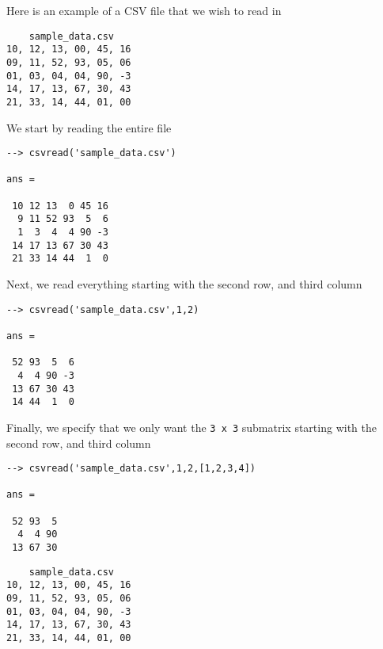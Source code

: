 Here is an example of a CSV file that we wish to read in
\begin{verbatim}
    sample_data.csv
10, 12, 13, 00, 45, 16
09, 11, 52, 93, 05, 06
01, 03, 04, 04, 90, -3
14, 17, 13, 67, 30, 43
21, 33, 14, 44, 01, 00
\end{verbatim}
We start by reading the entire file
\begin{verbatim}
--> csvread('sample_data.csv')

ans = 

 10 12 13  0 45 16 
  9 11 52 93  5  6 
  1  3  4  4 90 -3 
 14 17 13 67 30 43 
 21 33 14 44  1  0 
\end{verbatim}
Next, we read everything starting with the second row, and third column
\begin{verbatim}
--> csvread('sample_data.csv',1,2)

ans = 

 52 93  5  6 
  4  4 90 -3 
 13 67 30 43 
 14 44  1  0 
\end{verbatim}
Finally, we specify that we only want the \verb|3 x 3| submatrix starting
with the second row, and third column
\begin{verbatim}
--> csvread('sample_data.csv',1,2,[1,2,3,4])

ans = 

 52 93  5 
  4  4 90 
 13 67 30 
\end{verbatim}
\begin{verbatim}
    sample_data.csv
10, 12, 13, 00, 45, 16
09, 11, 52, 93, 05, 06
01, 03, 04, 04, 90, -3
14, 17, 13, 67, 30, 43
21, 33, 14, 44, 01, 00
\end{verbatim}
